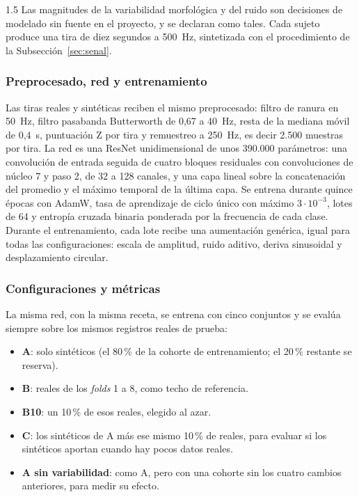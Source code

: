\begin{spacing}{1.5}
\noindent Las magnitudes de la variabilidad morfológica y del ruido son decisiones de modelado sin fuente en el proyecto, y se declaran como tales. Cada sujeto produce una tira de diez segundos a 500~Hz, sintetizada con el procedimiento de la Subsección~\ref{sec:senal}.

\subsubsection{Preprocesado, red y entrenamiento}

Las tiras reales y sintéticas reciben el mismo preprocesado: filtro de ranura en 50~Hz, filtro pasabanda Butterworth de 0,67 a 40~Hz, resta de la mediana móvil de 0,4~s, puntuación Z por tira y remuestreo a 250~Hz, es decir 2.500 muestras por tira. La red es una ResNet unidimensional de unos 390.000 parámetros: una convolución de entrada seguida de cuatro bloques residuales con convoluciones de núcleo 7 y paso 2, de 32 a 128 canales, y una capa lineal sobre la concatenación del promedio y el máximo temporal de la última capa. Se entrena durante quince épocas con AdamW, tasa de aprendizaje de ciclo único con máximo $3\cdot10^{-3}$, lotes de 64 y entropía cruzada binaria ponderada por la frecuencia de cada clase. Durante el entrenamiento, cada lote recibe una aumentación genérica, igual para todas las configuraciones: escala de amplitud, ruido aditivo, deriva sinusoidal y desplazamiento circular.

\subsubsection{Configuraciones y métricas}

La misma red, con la misma receta, se entrena con cinco conjuntos y se evalúa siempre sobre los mismos registros reales de prueba:

\begin{itemize}
    \item \textbf{A}: solo sintéticos (el 80\,\% de la cohorte de entrenamiento; el 20\,\% restante se reserva).
    \item \textbf{B}: reales de los \emph{folds} 1 a 8, como techo de referencia.
    \item \textbf{B10}: un 10\,\% de esos reales, elegido al azar.
    \item \textbf{C}: los sintéticos de A más ese mismo 10\,\% de reales, para evaluar si los sintéticos aportan cuando hay pocos datos reales.
    \item \textbf{A sin variabilidad}: como A, pero con una cohorte sin los cuatro cambios anteriores, para medir su efecto.
\end{itemize}


\end{spacing}

